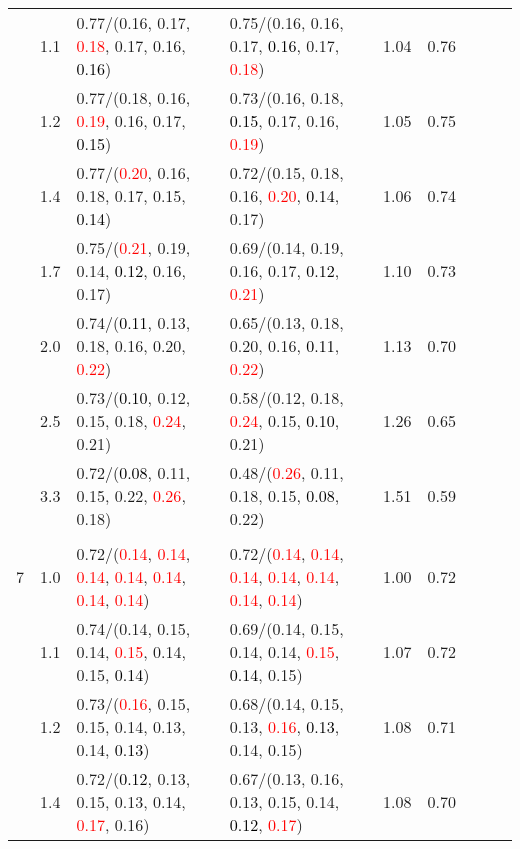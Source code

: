\documentclass[10pt,a4paper]{report}
\begin{document}
\begin{table}[!htbp]
\begin{center}
{\begin{tabular}{ccllccccc}
			&1.1&0.77/(0.16, 0.17, \textcolor{red}{0.18}, 0.17, 0.16, \textcolor{black}{0.16})&0.75/(0.16, 0.16, 0.17, \textcolor{black}{0.16}, 0.17, \textcolor{red}{0.18})&1.04&0.76\\
			&1.2&0.77/(0.18, 0.16, \textcolor{red}{0.19}, 0.16, 0.17, \textcolor{black}{0.15})&0.73/(0.16, 0.18, \textcolor{black}{0.15}, 0.17, 0.16, \textcolor{red}{0.19})&1.05&0.75\\
			&1.4&0.77/(\textcolor{red}{0.20}, 0.16, 0.18, 0.17, 0.15, \textcolor{black}{0.14})&0.72/(0.15, 0.18, 0.16, \textcolor{red}{0.20}, \textcolor{black}{0.14}, 0.17)&1.06&0.74\\
			&1.7&0.75/(\textcolor{red}{0.21}, 0.19, 0.14, \textcolor{black}{0.12}, 0.16, 0.17)&0.69/(0.14, 0.19, 0.16, 0.17, \textcolor{black}{0.12}, \textcolor{red}{0.21})&1.10&0.73\\
			&2.0&0.74/(\textcolor{black}{0.11}, 0.13, 0.18, 0.16, 0.20, \textcolor{red}{0.22})&0.65/(0.13, 0.18, 0.20, 0.16, \textcolor{black}{0.11}, \textcolor{red}{0.22})&1.13&0.70\\
			&2.5&0.73/(\textcolor{black}{0.10}, 0.12, 0.15, 0.18, \textcolor{red}{0.24}, 0.21)&0.58/(0.12, 0.18, \textcolor{red}{0.24}, 0.15, \textcolor{black}{0.10}, 0.21)&1.26&0.65\\
			&3.3&0.72/(\textcolor{black}{0.08}, 0.11, 0.15, 0.22, \textcolor{red}{0.26}, 0.18)&0.48/(\textcolor{red}{0.26}, 0.11, 0.18, 0.15, \textcolor{black}{0.08}, 0.22)&1.51&0.59\\
			&&&&\\
			7			&1.0&0.72/(\textcolor{red}{0.14}, \textcolor{red}{0.14}, \textcolor{red}{0.14}, \textcolor{red}{0.14}, \textcolor{red}{0.14}, \textcolor{red}{0.14}, \textcolor{red}{0.14})&0.72/(\textcolor{red}{0.14}, \textcolor{red}{0.14}, \textcolor{red}{0.14}, \textcolor{red}{0.14}, \textcolor{red}{0.14}, \textcolor{red}{0.14}, \textcolor{red}{0.14})&1.00&0.72\\
			&1.1&0.74/(0.14, 0.15, 0.14, \textcolor{red}{0.15}, 0.14, 0.15, \textcolor{black}{0.14})&0.69/(0.14, 0.15, 0.14, 0.14, \textcolor{red}{0.15}, \textcolor{black}{0.14}, 0.15)&1.07&0.72\\
			&1.2&0.73/(\textcolor{red}{0.16}, 0.15, 0.15, 0.14, 0.13, 0.14, \textcolor{black}{0.13})&0.68/(0.14, 0.15, 0.13, \textcolor{red}{0.16}, \textcolor{black}{0.13}, 0.14, 0.15)&1.08&0.71\\
			&1.4&0.72/(\textcolor{black}{0.12}, 0.13, 0.15, 0.13, 0.14, \textcolor{red}{0.17}, 0.16)&0.67/(0.13, 0.16, 0.13, 0.15, 0.14, \textcolor{black}{0.12}, \textcolor{red}{0.17})&1.08&0.70\\

\end{tabular}}
\end{center}
\end{table}
\end{document}
